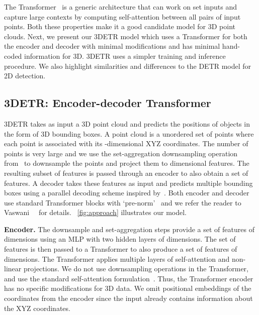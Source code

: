 \documentclass[10pt,twocolumn,letterpaper]{article}
\newcommand{\OURS}{3DETR\xspace}
\begin{document}
The Transformer~\cite{vaswani2017attention} is a generic architecture that can work on set inputs and capture large contexts by computing self-attention between all pairs of input points.
Both these properties make it a good candidate model for 3D point clouds.
Next, we present our \OURS model which uses a Transformer for both the encoder and decoder with minimal modifications and has minimal hand-coded information for 3D.
\OURS uses a simpler training and inference procedure.
We also highlight similarities and differences to the DETR model for 2D detection.

\vspace{-0.05in}
\subsection{\OURS: Encoder-decoder Transformer}
\label{sec:pointdetr}
\vspace{-0.05in}

\OURS takes as input a 3D point cloud and predicts the positions of objects in the form of 3D bounding boxes.
A point cloud is a unordered set of  points where each point is associated with its -dimensional XYZ coordinates.
The number of points is very large and we use the set-aggregation downsampling operation from~\cite{qi2017pointnet++} to downsample the points and project them to  dimensional features.
The resulting subset of  features is passed through an encoder to also obtain a set of  features.
A decoder takes these features as input and predicts multiple bounding boxes using a parallel decoding scheme inspired by~\cite{carion2020end}.
Both encoder and decoder use standard Transformer blocks with `pre-norm'~\cite{klein2017opennmt} and we refer the reader to Vaswani~\etal~\cite{vaswani2017attention} for details.
~\cref{fig:approach} illustrates our model.
\vspace{0.02in}
\par \noindent \textbf{Encoder.}
The downsample and set-aggregation steps provide a set of  features of  dimensions using an MLP with two hidden layers of  dimensions.
The set of  features is then passed to a Transformer to also produce a set of  features of  dimensions.
The Transformer applies multiple layers of self-attention and non-linear projections.
We do not use downsampling operations in the Transformer, and use the standard self-attention formulation~\cite{vaswani2017attention}.
Thus, the Transformer encoder has no specific modifications for 3D data.
We omit positional embeddings of the coordinates from the encoder since the input already contains information about the XYZ coordinates.
\end{document}
